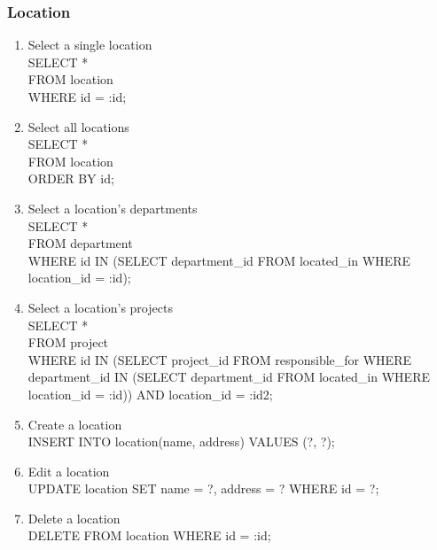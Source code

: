 \documentclass[fleqn, 11pt,letterpaper]{article}
\begin{document}
	\subsubsection{Location}
	\begin{enumerate}
		\item Select a single location \\SELECT * \\FROM location \\WHERE id = :id;
		\item Select all locations \\SELECT * \\FROM location \\ORDER BY id;
		\item Select a location's departments \\SELECT * \\FROM department \\WHERE id IN (SELECT department\_id FROM located\_in WHERE location\_id = :id);
		\item Select a location's projects \\SELECT * \\FROM project \\WHERE id IN (SELECT project\_id FROM responsible\_for WHERE department\_id IN (SELECT department\_id FROM located\_in WHERE location\_id = :id)) AND location\_id = :id2;
		\item Create a location \\INSERT INTO location(name, address) VALUES (?, ?); 
		\item Edit a location \\UPDATE location SET name = ?, address = ? WHERE id = ?;
		\item Delete a location \\DELETE FROM location WHERE id = :id;
	\end{enumerate}
\end{document}
